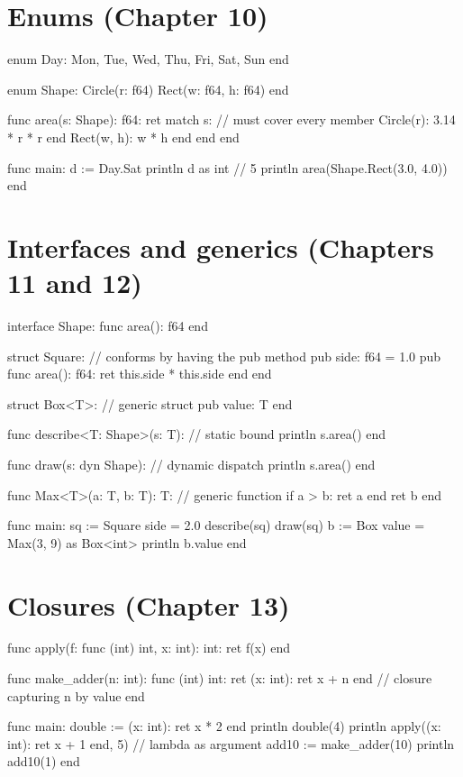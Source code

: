 \section*{Enums (Chapter 10)}

\begin{salamen}
enum Day: Mon, Tue, Wed, Thu, Fri, Sat, Sun end

enum Shape:
    Circle(r: f64)
    Rect(w: f64, h: f64)
end

func area(s: Shape): f64:
    ret match s:                     // must cover every member
        Circle(r): 3.14 * r * r end
        Rect(w, h): w * h end
    end
end

func main:
    d := Day.Sat
    println d as int                 // 5
    println area(Shape.Rect(3.0, 4.0))
end
\end{salamen}

\section*{Interfaces and generics (Chapters 11 and 12)}

\begin{salamen}
interface Shape:
    func area(): f64
end

struct Square:                       // conforms by having the pub method
    pub side: f64 = 1.0
    pub func area(): f64: ret this.side * this.side end
end

struct Box<T>:                       // generic struct
    pub value: T
end

func describe<T: Shape>(s: T):       // static bound
    println s.area()
end

func draw(s: dyn Shape):             // dynamic dispatch
    println s.area()
end

func Max<T>(a: T, b: T): T:          // generic function
    if a > b: ret a end
    ret b
end

func main:
    sq := Square { side = 2.0 }
    describe(sq)
    draw(sq)
    b := Box { value = Max(3, 9) } as Box<int>
    println b.value
end
\end{salamen}

\section*{Closures (Chapter 13)}

\begin{salamen}
func apply(f: func (int) int, x: int): int:
    ret f(x)
end

func make_adder(n: int): func (int) int:
    ret (x: int): ret x + n end      // closure capturing n by value
end

func main:
    double := (x: int): ret x * 2 end
    println double(4)
    println apply((x: int): ret x + 1 end, 5)   // lambda as argument
    add10 := make_adder(10)
    println add10(1)
end
\end{salamen}

